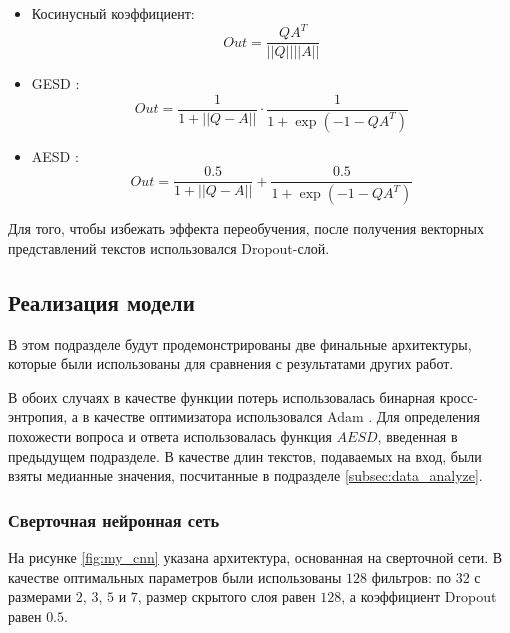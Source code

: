 \documentclass[../diploma.tex]{subfiles}
\begin{document}
\begin{itemize}
\begin{itemize}
\begin{itemize}
				\item
				Косинусный коэффициент: 
				\begin{equation}
					Out = \frac{Q A^T}{||Q|| ||A||}
   				\end{equation}

				\item
				GESD \cite{article:answer_selection}: 
				\begin{equation}
					Out = \frac{1}{1+||Q-A||} \cdot \frac{1}{1+\exp(-1-QA^T)}
   				\end{equation}

				\item
				AESD \cite{article:answer_selection}: 
				\begin{equation}
					Out = \frac{0.5}{1+||Q-A||} + \frac{0.5}{1+\exp(-1-QA^T)}
   				\end{equation}

			\end{itemize}

		\end{itemize}

	\end{itemize}

	Для того, чтобы избежать эффекта переобучения, после получения векторных представлений текстов использовался Dropout-слой.

	\subsection{Реализация модели}

	В этом подразделе будут продемонстрированы две финальные архитектуры, которые были использованы для сравнения с результатами других работ.

	В обоих случаях в качестве функции потерь использовалась бинарная кросс-энтропия, а в качестве оптимизатора использовался Adam \cite{article:adam}.
    Для определения похожести вопроса и ответа использовалась функция $AESD$, введенная в предыдущем подразделе.
    В качестве длин текстов, подаваемых на вход, были взяты медианные значения, посчитанные в подразделе \ref{subsec:data_analyze}.

	\subsubsection{Сверточная нейронная сеть}

	На рисунке \ref{fig:my_cnn} указана архитектура, основанная на сверточной сети.
	В качестве оптимальных параметров были использованы $128$ фильтров: по $32$ с размерами $2$, $3$, $5$ и $7$, размер скрытого слоя равен $128$, 
	а коэффициент Dropout равен $0.5$.
\end{document}

